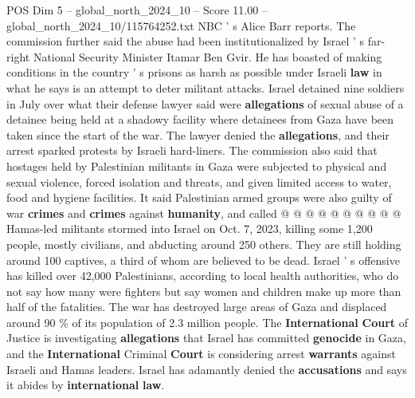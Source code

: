 \begin{textsample}{POS Dim 5 – global\_north\_2024\_10 – Score 11.00 – global\_north\_2024\_10/115764252.txt}
NBC ' s Alice Barr reports.
The commission further said the abuse had been institutionalized by Israel ' s far-right National Security Minister Itamar Ben Gvir.
He has boasted of making conditions in the country ' s prisons as harsh as possible under Israeli \textbf{law} in what he says is an attempt to deter militant attacks.
Israel detained nine soldiers in July over what their defense lawyer said were \textbf{allegations} of sexual abuse of a detainee being held at a shadowy facility where detainees from Gaza have been taken since the start of the war.
The lawyer denied the \textbf{allegations}, and their arrest sparked protests by Israeli hard-liners.
The commission also said that hostages held by Palestinian militants in Gaza were subjected to physical and sexual violence, forced isolation and threats, and given limited access to water, food and hygiene facilities.
It said Palestinian armed groups were also guilty of war \textbf{crimes} and \textbf{crimes} against \textbf{humanity}, and called @ @ @ @ @ @ @ @ @ @ Hamas-led militants stormed into Israel on Oct. 7, 2023, killing some 1,200 people, mostly civilians, and abducting around 250 others.
They are still holding around 100 captives, a third of whom are believed to be dead.
Israel ' s offensive has killed over 42,000 Palestinians, according to local health authorities, who do not say how many were fighters but say women and children make up more than half of the fatalities.
The war has destroyed large areas of Gaza and displaced around 90 \% of its population of 2.3 million people.
The \textbf{International} \textbf{Court} of Justice is investigating \textbf{allegations} that Israel has committed \textbf{genocide} in Gaza, and the \textbf{International} Criminal \textbf{Court} is considering arrest \textbf{warrants} against Israeli and Hamas leaders.
Israel has adamantly denied the \textbf{accusations} and says it abides by \textbf{international} \textbf{law}.

\end{textsample}
